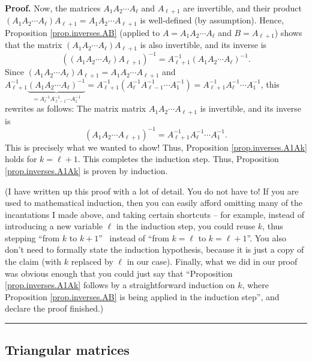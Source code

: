 \documentclass[numbers=enddot,12pt,final,onecolumn,notitlepage]{scrartcl}%
\theoremstyle{definition}
\newenvironment{proof}[1][Proof]{\noindent\textbf{#1.} }{\ \rule{0.5em}{0.5em}}
\begin{document}
\begin{proof}
Now, the matrices $A_{1}A_{2}\cdots A_{\ell}$ and $A_{\ell+1}$ are invertible,
and their product \newline$\left(  A_{1}A_{2}\cdots A_{\ell}\right)
A_{\ell+1}=A_{1}A_{2}\cdots A_{\ell+1}$ is well-defined (by assumption).
Hence, Proposition \ref{prop.inverses.AB} (applied to $A=A_{1}A_{2}\cdots
A_{\ell}$ and $B=A_{\ell+1}$) shows that the matrix $\left(  A_{1}A_{2}\cdots
A_{\ell}\right)  A_{\ell+1}$ is also invertible, and its inverse is
\[
\left(  \left(  A_{1}A_{2}\cdots A_{\ell}\right)  A_{\ell+1}\right)
^{-1}=A_{\ell+1}^{-1}\left(  A_{1}A_{2}\cdots A_{\ell}\right)  ^{-1}.
\]
Since $\left(  A_{1}A_{2}\cdots A_{\ell}\right)  A_{\ell+1}=A_{1}A_{2}\cdots
A_{\ell+1}$ and \newline$A_{\ell+1}^{-1}\underbrace{\left(  A_{1}A_{2}\cdots
A_{\ell}\right)  ^{-1}}_{=A_{\ell}^{-1}A_{\ell-1}^{-1}\cdots A_{1}^{-1}%
}=A_{\ell+1}^{-1}\left(  A_{\ell}^{-1}A_{\ell-1}^{-1}\cdots A_{1}^{-1}\right)
=A_{\ell+1}^{-1}A_{\ell}^{-1}\cdots A_{1}^{-1}$, this rewrites as follows: The
matrix matrix $A_{1}A_{2}\cdots A_{\ell+1}$ is invertible, and its inverse is
\[
\left(  A_{1}A_{2}\cdots A_{\ell+1}\right)  ^{-1}=A_{\ell+1}^{-1}A_{\ell}%
^{-1}\cdots A_{1}^{-1}.
\]
This is precisely what we wanted to show! Thus, Proposition
\ref{prop.inverses.A1Ak} holds for $k=\ell+1$. This completes the induction
step. Thus, Proposition \ref{prop.inverses.A1Ak} is proven by induction.

(I have written up this proof with a lot of detail. You do not have to! If you
are used to mathematical induction, then you can easily afford omitting many
of the incantations I made above, and taking certain shortcuts -- for example,
instead of introducing a new variable $\ell$ in the induction step, you could
reuse $k$, thus stepping \textquotedblleft from $k$ to $k+1$\textquotedblright%
\ instead of \textquotedblleft from $k=\ell$ to $k=\ell+1$\textquotedblright.
You also don't need to formally state the induction hypothesis, because it is
just a copy of the claim (with $k$ replaced by $\ell$ in our case). Finally,
what we did in our proof was obvious enough that you could just say that
\textquotedblleft Proposition \ref{prop.inverses.A1Ak} follows by a
straightforward induction on $k$, where Proposition \ref{prop.inverses.AB} is
being applied in the induction step\textquotedblright, and declare the proof finished.)
\end{proof}

\subsection{Triangular matrices}
\end{document}
